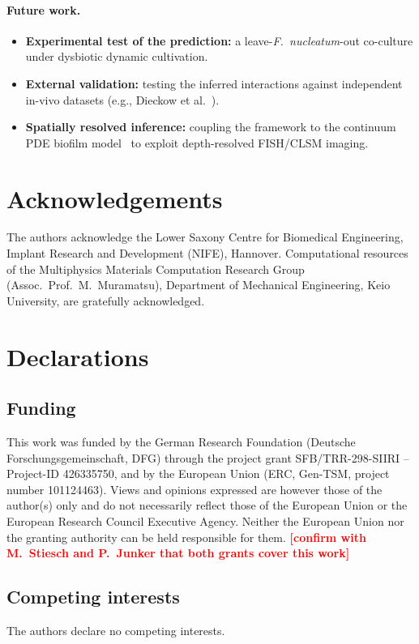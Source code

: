 \documentclass[11pt,a4paper]{article}
\newcommand{\TBD}[1]{\textcolor{red}{\textbf{[#1]}}}
\begin{document}
\paragraph{Future work.}
\begin{itemize}[nosep,leftmargin=*]
    \item \textbf{Experimental test of the prediction:} a leave-\textit{F.~nucleatum}-out co-culture under dysbiotic dynamic cultivation.
    \item \textbf{External validation:} testing the inferred interactions against independent in-vivo datasets (e.g., Dieckow et al.~\cite{dieckow2024structure}).
    \item \textbf{Spatially resolved inference:} coupling the framework to the continuum PDE biofilm model~\cite{Klempt2025ContinuumBiofilm} to exploit depth-resolved FISH/CLSM imaging.
\end{itemize}


\section*{Acknowledgements}
The authors acknowledge the Lower Saxony Centre for Biomedical Engineering, Implant Research and Development (NIFE), Hannover.
Computational resources of the Multiphysics Materials Computation Research Group (Assoc.\ Prof.\ M.~Muramatsu), Department of Mechanical Engineering, Keio University, are gratefully acknowledged.

\section*{Declarations}

\subsection*{Funding}
This work was funded by the German Research Foundation (Deutsche Forschungsgemeinschaft, DFG) through the project grant SFB/TRR-298-SIIRI -- Project-ID 426335750, and by the European Union (ERC, Gen-TSM, project number 101124463).
Views and opinions expressed are however those of the author(s) only and do not necessarily reflect those of the European Union or the European Research Council Executive Agency. Neither the European Union nor the granting authority can be held responsible for them.
\TBD{confirm with M.~Stiesch and P.~Junker that both grants cover this work}

\subsection*{Competing interests}
The authors declare no competing interests.
\end{document}
